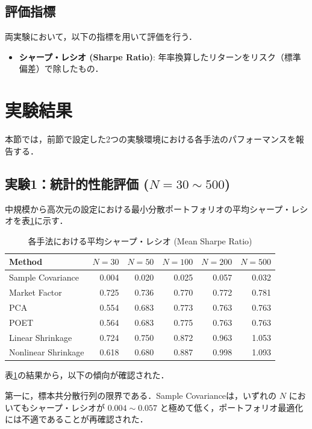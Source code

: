 \documentclass[lualatex,a4paper,11pt]{jlreq}
\begin{document}
\subsection{評価指標}
両実験において，以下の指標を用いて評価を行う．
\begin{itemize}
    \item \textbf{シャープ・レシオ (Sharpe Ratio)}: 年率換算したリターンをリスク（標準偏差）で除したもの．
\end{itemize}

\section{実験結果}

本節では，前節で設定した2つの実験環境における各手法のパフォーマンスを報告する．

\subsection{実験1：統計的性能評価 (\texorpdfstring{$N=30 \sim 500$}{N=30 - 500})}

中規模から高次元の設定における最小分散ポートフォリオの平均シャープ・レシオを表\ref{tab:exp1_result}に示す．

\begin{table}[h]
\centering
\caption{各手法における平均シャープ・レシオ (Mean Sharpe Ratio)}
\label{tab:exp1_result}
\begin{tabular}{lrrrrr}
\hline
Method & $N=30$ & $N=50$ & $N=100$ & $N=200$ & $N=500$ \\ \hline
Sample Covariance & 0.004 & 0.020 & 0.025 & 0.057 & 0.032 \\
Market Factor & 0.725 & 0.736 & 0.770 & 0.772 & 0.781 \\
PCA & 0.554 & 0.683 & 0.773 & 0.763 & 0.763 \\
POET & 0.564 & 0.683 & 0.775 & 0.763 & 0.763 \\
Linear Shrinkage & 0.724 & 0.750 & 0.872 & 0.963 & 1.053 \\
Nonlinear Shrinkage & 0.618 & 0.680 & 0.887 & 0.998 & 1.093 \\ \hline
\end{tabular}
\end{table}

表\ref{tab:exp1_result}の結果から，以下の傾向が確認された．

第一に，標本共分散行列の限界である．Sample Covarianceは，いずれの $N$ においてもシャープ・レシオが $0.004 \sim 0.057$ と極めて低く，ポートフォリオ最適化には不適であることが再確認された．
\end{document}
